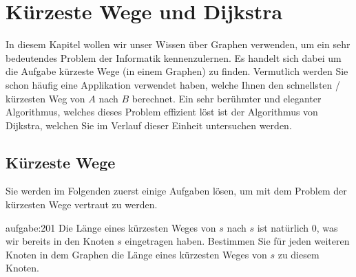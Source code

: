 \chapter{Kürzeste Wege und Dijkstra}\label{ch:Lektion}
In diesem Kapitel wollen wir unser Wissen über Graphen verwenden, um ein sehr bedeutendes Problem der Informatik kennenzulernen. Es handelt sich dabei um die Aufgabe kürzeste Wege (in einem Graphen) zu finden. Vermutlich werden Sie schon häufig eine Applikation verwendet haben, welche Ihnen den schnellsten / kürzesten Weg von $A$ nach $B$ berechnet. Ein sehr berühmter und eleganter Algorithmus, welches dieses Problem effizient löst ist der Algorithmus von Dijkstra, welchen Sie im Verlauf dieser Einheit untersuchen werden.

\section{Kürzeste Wege}
Sie werden im Folgenden zuerst einige Aufgaben lösen, um mit dem Problem der kürzesten Wege vertraut zu werden.
\begin{aufgabe}{aufgabe:201}
Die Länge eines kürzesten Weges von $s$ nach $s$ ist natürlich 0, was wir bereits in den Knoten $s$ eingetragen haben. Bestimmen Sie für jeden weiteren Knoten in dem Graphen die Länge eines kürzesten Weges von $s$ zu diesem Knoten.
\begin{figure}[H]
\centering
{}%
\end{figure}  
\end{aufgabe}


